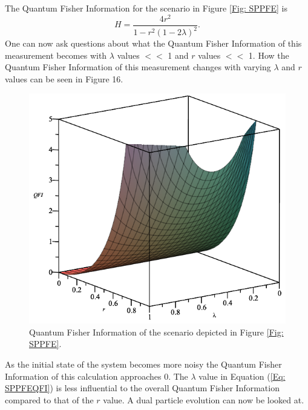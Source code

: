 \documentclass[twocolumn]{article}
\begin{document}
\par \noindent
The Quantum Fisher Information for the scenario in Figure \ref{Fig: SPPFE} is
\begin{equation}\label{Eq: SPPFEQFI}
H=\frac{4r^2}{1-r^2(1-2\lambda)^2}.
\end{equation}
One can now ask questions about what the Quantum Fisher Information of this measurement becomes with $\lambda$ values $<<$ 1 and $r$ values $<<$ 1. How the Quantum Fisher Information of this measurement changes with varying $\lambda$ and $r$ values can be seen in Figure 16.
\begin{figure}[ht]
    \centering
    \includegraphics[scale=0.40]{Phase-Flip-Lambda-QFI-Graph.png}
    \caption{\footnotesize{Quantum Fisher Information of the scenario depicted in Figure \ref{Fig: SPPFE}.}}
    \label{Fig: PFLQFIG}
\end{figure}
\par \noindent
As the initial state of the system becomes more noisy the Quantum Fisher Information of this calculation approaches $0$. The $\lambda$ value in Equation (\ref{Eq: SPPFEQFI}) is less influential to the overall Quantum Fisher Information compared to that of the $r$ value. A dual particle evolution can now be looked at.
\end{document}
